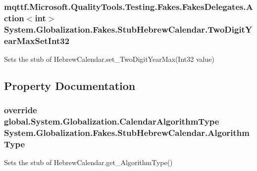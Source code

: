 \hypertarget{class_system_1_1_globalization_1_1_fakes_1_1_stub_hebrew_calendar_aeb30946e91e95e04cebcb954af286bb3}{
\subsubsection[{Two\-Digit\-Year\-Max\-Set\-Int32}]{\setlength{\rightskip}{0pt plus 5cm}mqttf.\-Microsoft.\-Quality\-Tools.\-Testing.\-Fakes.\-Fakes\-Delegates.\-Action$<$int$>$ System.\-Globalization.\-Fakes.\-Stub\-Hebrew\-Calendar.\-Two\-Digit\-Year\-Max\-Set\-Int32}}\label{class_system_1_1_globalization_1_1_fakes_1_1_stub_hebrew_calendar_aeb30946e91e95e04cebcb954af286bb3}


Sets the stub of Hebrew\-Calendar.\-set\-\_\-\-Two\-Digit\-Year\-Max(\-Int32 value)



\subsection{Property Documentation}
\hypertarget{class_system_1_1_globalization_1_1_fakes_1_1_stub_hebrew_calendar_aa5b6cd6800dbcbfb78c6b2ccb44b49e7}{
\subsubsection[{Algorithm\-Type}]{\setlength{\rightskip}{0pt plus 5cm}override global.\-System.\-Globalization.\-Calendar\-Algorithm\-Type System.\-Globalization.\-Fakes.\-Stub\-Hebrew\-Calendar.\-Algorithm\-Type\hspace{0.3cm}{\ttfamily [get]}}}\label{class_system_1_1_globalization_1_1_fakes_1_1_stub_hebrew_calendar_aa5b6cd6800dbcbfb78c6b2ccb44b49e7}


Sets the stub of Hebrew\-Calendar.\-get\-\_\-\-Algorithm\-Type()

